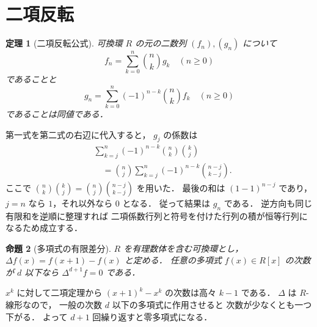 \documentclass[a5paper,10pt,onecolumn]{jsarticle}
\makeatletter
\theoremstyle{mathnotetheorem}
\newtheorem{theorem}{定理}[section]
\newtheorem{proposition}[theorem]{命題}
\renewcommand{\proofname}{証明}
\renewenvironment{proof}[1][\proofname]{%
  \par\pushQED{\qed}\normalfont\topsep4\p@\@plus2\p@\relax
  \trivlist\item[\hskip\labelsep\bfseries #1]\ignorespaces
}{\popQED\endtrivlist\@endpefalse}
\makeatother
\begin{document}
\section{二項反転}
\begin{theorem}[二項反転公式]\label{thm:binomialinv}
可換環 $R$ の元の二数列 $(f_n),(g_n)$ について
\[
 f_n=\sum_{k=0}^n{n\choose k}g_k
\quad(n\ge0)
\]
であることと
\[
 g_n=\sum_{k=0}^n(-1)^{n-k}{n\choose k}f_k
\quad(n\ge0)
\]
であることは同値である．
\end{theorem}
\begin{proof}
第一式を第二式の右辺に代入すると，
$g_j$ の係数は
\[
 \begin{aligned}
 &\sum_{k=j}^n(-1)^{n-k}{n\choose k}{k\choose j}\\
 &\quad={n\choose j}
  \sum_{k=j}^n(-1)^{n-k}{n-j\choose k-j}.
 \end{aligned}
\]
ここで
$ {n\choose k}{k\choose j}
 ={n\choose j}{n-j\choose k-j}$ を用いた．
最後の和は $(1-1)^{n-j}$ であり，
$j=n$ なら $1$，それ以外なら $0$ となる．
従って結果は $g_n$ である．
逆方向も同じ有限和を逆順に整理すれば
二項係数行列と符号を付けた行列の積が恒等行列になるため成立する．
\end{proof}
\begin{proposition}[多項式の有限差分]
$R$ を有理数体を含む可換環とし，
$\Delta f(x)=f(x+1)-f(x)$ と定める．
任意の多項式 $f(x)\in R[x]$ の次数が $d$ 以下なら
$\Delta^{d+1}f=0$ である．
\end{proposition}
\begin{proof}
$x^k$ に対して二項定理から
$(x+1)^k-x^k$ の次数は高々 $k-1$ である．
$\Delta$ は $R$-線形なので，
一般の次数 $d$ 以下の多項式に作用させると
次数が少なくとも一つ下がる．
よって $d+1$ 回繰り返すと零多項式になる．
\end{proof}
\end{document}

